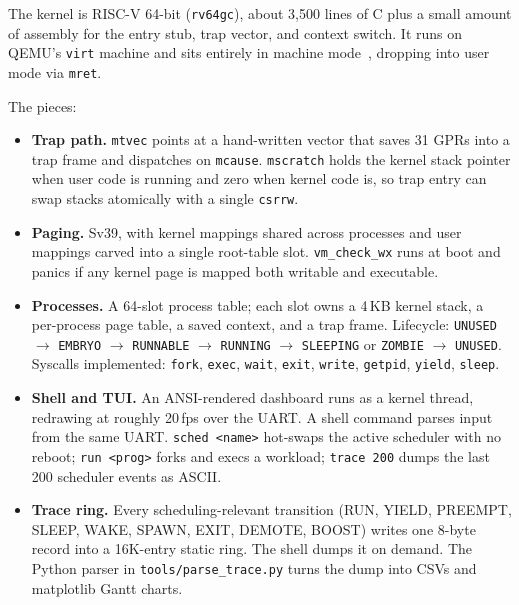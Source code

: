 \documentclass[11pt]{article}
\begin{document}
The kernel is RISC-V 64-bit (\texttt{rv64gc}), about 3{,}500 lines of C plus
a small amount of assembly for the entry stub, trap vector, and context
switch. It runs on QEMU's \texttt{virt} machine and sits entirely in machine
mode~\cite{riscvspec}, dropping into user mode via \texttt{mret}.

The pieces:

\begin{itemize}
  \item \textbf{Trap path.} \texttt{mtvec} points at a hand-written vector
  that saves 31 GPRs into a trap frame and dispatches on \texttt{mcause}.
  \texttt{mscratch} holds the kernel stack pointer when user code is running
  and zero when kernel code is, so trap entry can swap stacks atomically with
  a single \texttt{csrrw}.

  \item \textbf{Paging.} Sv39, with kernel mappings shared across processes
  and user mappings carved into a single root-table slot. \texttt{vm\_check\_wx}
  runs at boot and panics if any kernel page is mapped both writable and
  executable.

  \item \textbf{Processes.} A 64-slot process table; each slot owns a 4\,KB
  kernel stack, a per-process page table, a saved context, and a trap frame.
  Lifecycle: \texttt{UNUSED} $\to$ \texttt{EMBRYO} $\to$ \texttt{RUNNABLE}
  $\to$ \texttt{RUNNING} $\to$ \texttt{SLEEPING} or \texttt{ZOMBIE} $\to$
  \texttt{UNUSED}. Syscalls implemented: \texttt{fork}, \texttt{exec},
  \texttt{wait}, \texttt{exit}, \texttt{write}, \texttt{getpid},
  \texttt{yield}, \texttt{sleep}.

  \item \textbf{Shell and TUI.} An ANSI-rendered dashboard runs as a kernel
  thread, redrawing at roughly 20\,fps over the UART. A shell command parses
  input from the same UART. \texttt{sched <name>} hot-swaps the active
  scheduler with no reboot; \texttt{run <prog>} forks and execs a workload;
  \texttt{trace 200} dumps the last 200 scheduler events as ASCII.

  \item \textbf{Trace ring.} Every scheduling-relevant transition (RUN,
  YIELD, PREEMPT, SLEEP, WAKE, SPAWN, EXIT, DEMOTE, BOOST) writes one 8-byte
  record into a 16K-entry static ring. The shell dumps it on demand. The
  Python parser in \texttt{tools/parse\_trace.py} turns the dump into CSVs
  and matplotlib Gantt charts.
\end{itemize}
\end{document}
